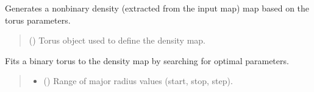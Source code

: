 \documentclass[letterpaper,10pt,english]{sphinxmanual}
\begin{document}
\begin{fulllineitems}
\begin{fulllineitems}
\begin{quote}
\begin{description}
\end{description}\end{quote}

\end{fulllineitems}


\begin{fulllineitems}
\label{\detokenize{src:src.BagelFitter.BagelFitter.fill_nonbinary_density}}
\pysigstartsignatures
{}
\pysigstopsignatures
\sphinxAtStartPar
Generates a non\sphinxhyphen{}binary density (extracted from the input map) map based on the torus parameters.
\begin{quote}\begin{description}
\sphinxAtStartPar
{} ({\hyperref[\detokenize{src:src.Torus.Torus}]{}}) \textendash{} Torus object used to define the density map.

\end{description}\end{quote}

\end{fulllineitems}


\begin{fulllineitems}
\label{\detokenize{src:src.BagelFitter.BagelFitter.fit_binary_torus}}
\pysigstartsignatures
{}
\pysigstopsignatures
\sphinxAtStartPar
Fits a binary torus to the density map by searching for optimal parameters.
\begin{quote}\begin{description}
\begin{itemize}
\item {} 
\sphinxAtStartPar
{} (\sphinxstyleliteralemphasis{\sphinxupquote{, }}) \textendash{} Range of major radius values (start, stop, step).


\end{itemize}
\end{description}
\end{quote}
\end{fulllineitems}
\end{fulllineitems}
\end{document}
